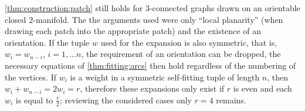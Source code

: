 \begin{remark}
  \autoref{thm:construction:patch} still holds for $3$-connected graphs drawn on an orientable closed $2$-manifold. The the arguments used were only ``local planarity'' (when drawing each patch into the appropriate patch) and the existence of an orientation. If the tuple $w$ used for the expansion is also symmetric, that is, $w_i = w_{n-i}$, $i = 1, \dots n$, the requirement of an orientation can be dropped, the necessary equations of \autoref{thm:fitting:arcs} then hold regardless of the numbering of the vertices. If $w_i$ is a weight in a symmetric self-fitting tuple of length $n$, then $w_i + w_{n-i} = 2 w_i = r$, therefore these expansions only exist if $r$ is even and each $w_i$ is equal to $\frac{r}{2}$; reviewing the considered cases only $r = 4$ remains.
\end{remark}
